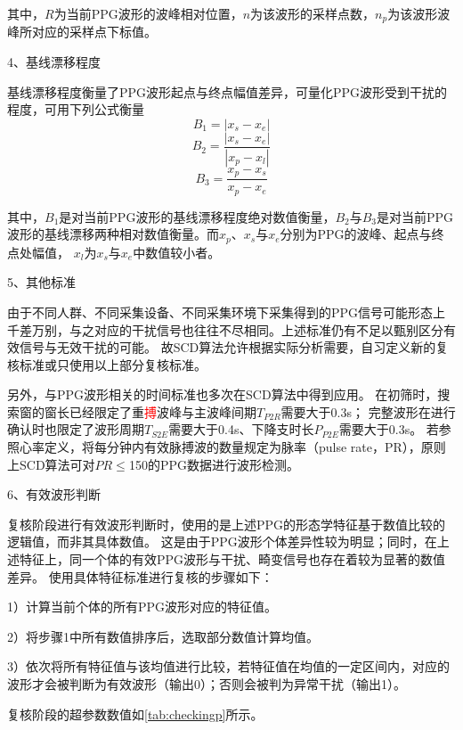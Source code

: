其中，$R$为当前PPG波形的波峰相对位置，$n$为该波形的采样点数，$n_p$为该波形波峰所对应的采样点下标值。

4、基线漂移程度 

基线漂移程度衡量了PPG波形起点与终点幅值差异，可量化PPG波形受到干扰的程度，可用下列公式衡量
\begin{equation}
    \label{equ:b1}
    B_1 = |x_s-x_e|
\end{equation}
\begin{equation}
    \label{equ:b2}
    B_2 = \frac{|x_s-x_e|}{|x_p-x_l|}
\end{equation}
\begin{equation}
    \label{equ:b3}
    B_3 = \frac{x_p-x_s}{x_p-x_e}
\end{equation}

其中，$B_1$是对当前PPG波形的基线漂移程度绝对数值衡量，$B_2$与$B_3$是对当前PPG波形的基线漂移两种相对数值衡量。而$x_p$、$x_s$与$x_e$分别为PPG的波峰、起点与终点处幅值，
$x_l$为$x_s$与$x_e$中数值较小者。

5、其他标准

由于不同人群、不同采集设备、不同采集环境下采集得到的PPG信号可能形态上千差万别，与之对应的干扰信号也往往不尽相同。上述标准仍有不足以甄别区分有效信号与无效干扰的可能。
故SCD算法允许根据实际分析需要，自习定义新的复核标准或只使用以上部分复核标准。

另外，与PPG波形相关的时间标准也多次在SCD算法中得到应用。
在初筛时，搜索窗的窗长已经限定了重\textcolor{red}{搏}波峰与主波峰间期$T_{P2R}$需要大于0.3s；
完整波形在进行确认时也限定了波形周期$T_{S2E}$需要大于0.4s、下降支时长$P_{P2E}$需要大于0.3s。
若参照心率定义，将每分钟内有效脉搏波的数量规定为脉率（pulse rate，PR），原则上SCD算法可对$PR \le$150的PPG数据进行波形检测。

6、有效波形判断

复核阶段进行有效波形判断时，使用的是上述PPG的形态学特征基于数值比较的逻辑值，而非其具体数值。
这是由于PPG波形个体差异性较为明显；同时，在上述特征上，同一个体的有效PPG波形与干扰、畸变信号也存在着较为显著的数值差异。
使用具体特征标准进行复核的步骤如下：

1）计算当前个体的所有PPG波形对应的特征值。

2）将步骤1中所有数值排序后，选取部分数值计算均值。

3）依次将所有特征值与该均值进行比较，若特征值在均值的一定区间内，对应的波形才会被判断为有效波形（输出0）；否则会被判为异常干扰（输出1）。

复核阶段的超参数数值如\autoref{tab:checkingp}所示。

